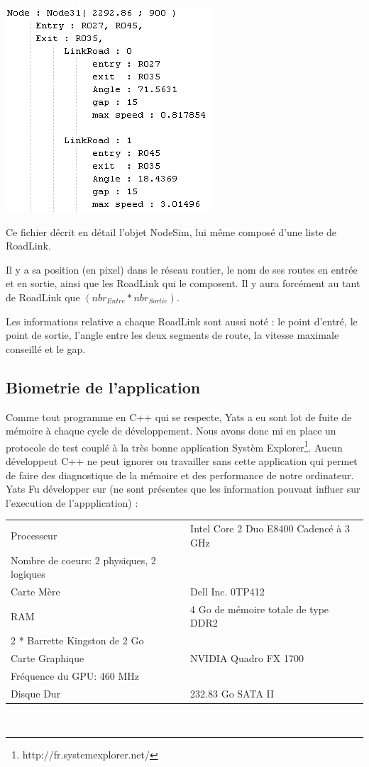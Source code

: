 \documentclass[a4paper,11pt]{article}
\begin{document}
\vspace{0.25cm}

\includegraphics[scale=0.8]{imgDiverses/logNODE.png}

Ce fichier décrit en détail l'objet NodeSim, lui même composé d'une liste de RoadLink.

Il y a sa position (en pixel) dans le réseau routier, le nom de ses routes en entrée et en sortie, ainsi que les RoadLink qui le composent. Il y aura forcément au tant de RoadLink que $(nbr_{Entre} * nbr_{Sortie})$.

Les informations relative a chaque RoadLink sont aussi noté : le point d'entré, le point de sortie, l'angle entre les deux segments de route, la vitesse maximale conseillé et le gap.



\subsection{Biometrie de l'application}

Comme tout programme en C++ qui se respecte, Yats a eu sont lot de fuite de mémoire à chaque cycle de développement. Nous avons donc mi en place un protocole de test couplé à la très bonne application Systèm Explorer\footnote{http://fr.systemexplorer.net/ }. Aucun développeut C++ ne peut ignorer ou travailler sans cette application qui permet de faire des diagnostique de la mémoire et des performance de notre ordinateur.\\

Yats Fu développer sur (ne sont présentes que les information pouvant influer sur l'execution de l'appplication) : \\

    \begin{tabular}{| M{2.5cm} | M{8cm} |}
    \hline
    Processeur & Intel Core 2 Duo E8400 Cadencé à 3 GHz\\Nombre de coeurs: 2 physiques, 2 logiques \tabularnewline
    \hline
    Carte Mère & Dell Inc. 0TP412  \tabularnewline
    \hline
    RAM & 4 Go de mémoire totale de type DDR2 \\ 2 * Barrette Kingston de 2 Go \tabularnewline
    \hline
    Carte Graphique &  	
NVIDIA Quadro FX 1700\\
Fréquence du GPU: 460 MHz \tabularnewline
    \hline
    Disque Dur & 232.83 Go SATA II\tabularnewline
    \hline
 \end{tabular}\\
\end{document}
